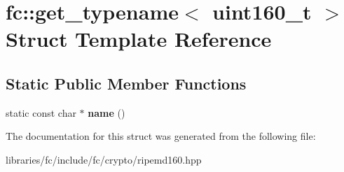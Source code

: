 \hypertarget{structfc_1_1get__typename_3_01uint160__t_01_4}{}\section{fc\+:\+:get\+\_\+typename$<$ uint160\+\_\+t $>$ Struct Template Reference}
\label{structfc_1_1get__typename_3_01uint160__t_01_4}
\subsection*{Static Public Member Functions}
\begin{DoxyCompactItemize}
\item 
\mbox{\label{structfc_1_1get__typename_3_01uint160__t_01_4_a4ef3b738c8851cd69e22743a7f81db1b}} 
static const char $\ast$ {\bfseries name} ()
\end{DoxyCompactItemize}


The documentation for this struct was generated from the following file\+:\begin{DoxyCompactItemize}
\item 
libraries/fc/include/fc/crypto/ripemd160.\+hpp\end{DoxyCompactItemize}
